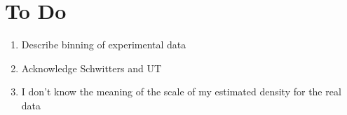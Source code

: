 \documentclass[twocolumn]{article}
\begin{document}
\section{To Do}
\label{sec:todo}

\begin{enumerate}
\item Describe binning of experimental data
\item Acknowledge Schwitters and UT
\item I don't know the meaning of the scale of my estimated density
  for the real data
\end{enumerate}


\end{document}
